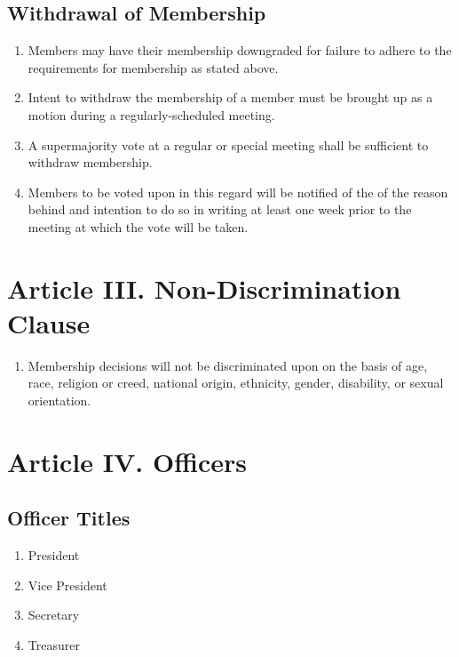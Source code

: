 \documentclass[12pt]{scrartcl} %
\begin{document}
	\subsection{Withdrawal of Membership}
		\begin{enumerate}
			\item Members may have their membership downgraded for failure to adhere to the requirements for membership as stated above.
			\item Intent to withdraw the membership of a member must be brought up as a motion during a regularly-scheduled meeting.
			\item A supermajority vote at a regular or special meeting shall be sufficient to withdraw membership.
			\item Members to be voted upon in this regard will be notified of the of the reason behind and intention to do so in writing at least one week prior to the meeting at which the vote will be taken.
		\end{enumerate}

\section{Article III. Non-Discrimination Clause}
	\begin{enumerate}
		\item Membership decisions will not be discriminated upon on the basis of age, race, religion or creed, national origin, ethnicity, gender, disability, or sexual orientation.
	\end{enumerate}

\section{Article IV. Officers}
	\subsection{Officer Titles}
		\begin{enumerate}
			\item President
			\item Vice President
			\item Secretary
			\item Treasurer
		\end{enumerate}
\end{document}
